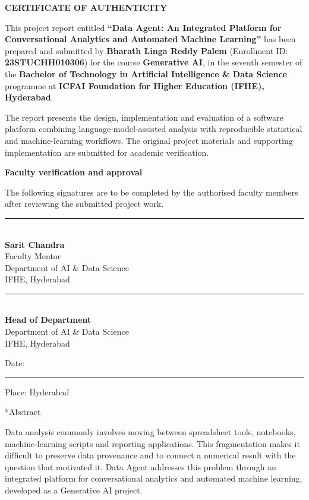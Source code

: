 \documentclass[11pt,a4paper]{article}
\makeatletter
\renewcommand\section{\@startsection{section}{1}{0pt}{-2.6ex plus -.5ex}{1.2ex}{\large\bfseries\color{navy}}}
\makeatother
\begin{document}
\thispagestyle{empty}
\begin{center}{\Large\bfseries\color{navy} CERTIFICATE OF AUTHENTICITY}\end{center}
\vspace{1cm}
This project report entitled \textbf{``Data Agent: An Integrated Platform for Conversational Analytics and Automated Machine Learning''} has been prepared and submitted by \textbf{Bharath Linga Reddy Palem} (Enrollment ID: \textbf{23STUCHH010306}) for the course \textbf{Generative AI}, in the seventh semester of the \textbf{Bachelor of Technology in Artificial Intelligence \& Data Science} programme at \textbf{ICFAI Foundation for Higher Education (IFHE), Hyderabad}.

The report presents the design, implementation and evaluation of a software platform combining language-model-assisted analysis with reproducible statistical and machine-learning workflows. The original project materials and supporting implementation are submitted for academic verification.

\vspace{.55cm}
\noindent\textbf{Faculty verification and approval}

The following signatures are to be completed by the authorised faculty members after reviewing the submitted project work.
\vspace{2.3cm}

\noindent\begin{minipage}[t]{.43\textwidth}
\rule{\linewidth}{.4pt}\\[7pt]
\textbf{Sarit Chandra}\\
Faculty Mentor\\
Department of AI \& Data Science\\
IFHE, Hyderabad
\end{minipage}\hfill
\begin{minipage}[t]{.43\textwidth}
\rule{\linewidth}{.4pt}\\[7pt]
\textbf{Head of Department}\\
Department of AI \& Data Science\\
IFHE, Hyderabad
\end{minipage}
\par\vspace{1.25cm}
\noindent Date: \rule{3cm}{.4pt}\hfill Place: Hyderabad
\clearpage

\hypersetup{pageanchor=true}
\section*{Abstract}
Data analysis commonly involves moving between spreadsheet tools, notebooks, machine-learning scripts and reporting applications. This fragmentation makes it difficult to preserve data provenance and to connect a numerical result with the question that motivated it. Data Agent addresses this problem through an integrated platform for conversational analytics and automated machine learning, developed as a Generative AI project.
\end{document}
